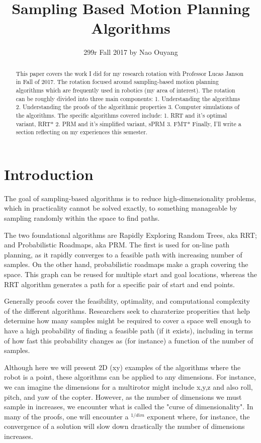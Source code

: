 \documentclass[a4paper]{article}
\title{Sampling Based Motion Planning Algorithms}
\author{299r Fall 2017 by Nao Ouyang}
\begin{document}
\maketitle

\begin{abstract} 
This paper covers the work I did for my research rotation with Professor Lucas
Janson in Fall of 2017. The rotation focused around sampling-based motion
planning algorithms which are frequently used in robotics (my area of
interest).  The rotation can be roughly divided into three main components: 1.
Understanding the algorithms 2. Understanding the proofs of the algorithmic
properties 3. Computer simulations of the algorithms. The specific algorithms
covered include: 1. RRT and it's optimal variant, RRT* 2. PRM and it's
simplified variant, sPRM 3. FMT* Finally, I'll write a section reflecting on my
experiences this semester.

\end{abstract}

\section{Introduction}

The goal of sampling-based algorithms is to reduce high-dimensionality
problems, which in practicality cannot be solved exactly, to something
manageable by sampling randomly within the space to find paths.

The two foundational algorithms are Rapidly Exploring Random Trees, aka RRT;
and Probabilistic Roadmaps, aka PRM. The first is used for on-line path
planning, as it rapidly converges to a feasible path with increasing number of
samples. On the other hand, probabilistic roadmaps make a graph covering the
space. This graph can be reused for multiple start and goal locations, whereas
the RRT algorithm generates a path for a specific pair of start and end points.

Generally proofs cover the feasibility, optimality, and computational complexity
of the different algorithms. Researchers seek to charaterize properities that
help determine how many samples might be required to cover a space well enough
to have a high probability of finding a feasible path (if it exists), including
in terms of how fast this probability changes as (for instance) a function of
the number of samples.

Although here we will present 2D (xy) examples of the algorithms where the robot
is a point, these algorithms can be applied to any dimensions. For instance, we
can imagine the dimensions for a multirotor might include x,y,z and also roll,
pitch, and yaw of the copter. However, as the number of dimensions we must sample in
increases, we encounter what is called the "curse of dimensionality". In many of
the proofs, one will encounter a $^{1/dim}$ exponent where, for instance, the
convergence of a solution will slow down drastically the number of dimensions
increases.
\end{document}
